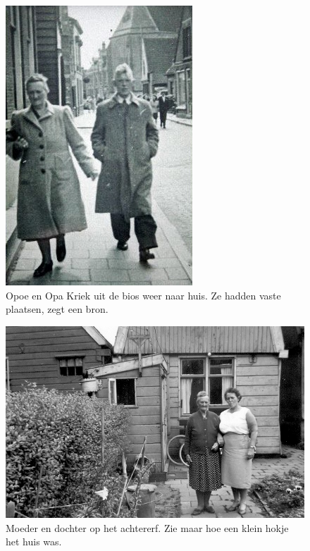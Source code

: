 \documentclass[10pt,twoside, openright]{memoir}
\begin{document}
\begin{figure}
\includegraphics[width=\textwidth]{img/ch3/vandebios}
\caption*{\footnotesize Opoe en Opa Kriek uit de bios weer naar huis. Ze hadden vaste plaatsen, zegt een bron.}
\end{figure}

\begin{figure}
\includegraphics[width=\textwidth]{img/ch3/opoe82jr}
\caption*{\footnotesize Moeder en dochter op het achtererf. Zie maar hoe een klein hokje het huis was.}
\end{figure}
\end{document}
